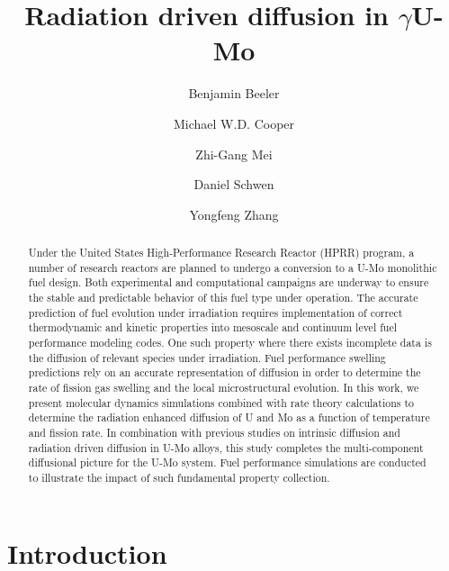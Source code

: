 \documentclass[review]{elsarticle}
\begin{document}
\begin{frontmatter}
\title{Radiation driven diffusion in $\gamma$U-Mo}

\author[ncsu,inl]{Benjamin Beeler}
\author[lanl]{Michael W.D. Cooper}
\author[anl]{Zhi-Gang Mei}
\author[inl]{Daniel Schwen}
\author[wisc,inl]{Yongfeng Zhang}
\address[ncsu]{North Carolina State University, Raleigh, NC 27695}
\address[inl]{Idaho National Laboratory, Idaho Falls, ID 83415}
\address[lanl]{Los Alamos National Laboratory, Los Alamos, NM 87545}
\address[anl]{Argonne National Laboratory, Lemont, IL 60439}
\address[wisc]{University of Wisconsin-Madison, Madison, WI 53715}

\begin{abstract}
Under the United States High-Performance Research Reactor (HPRR) program, a number of research reactors are planned to undergo a conversion to a U-Mo monolithic fuel design. Both experimental and computational campaigns are underway to ensure the stable and predictable behavior of this fuel type under operation. The accurate prediction of fuel evolution under irradiation requires implementation of correct thermodynamic and kinetic properties into mesoscale and continuum level fuel performance modeling codes. One such property where there exists incomplete data is the diffusion of relevant species under irradiation. Fuel performance swelling predictions rely on an accurate representation of diffusion in order to determine the rate of fission gas swelling and the local microstructural evolution. In this work, we present molecular dynamics simulations combined with rate theory calculations to determine the radiation enhanced diffusion of U and Mo as a function of temperature and fission rate. In combination with previous studies on intrinsic diffusion and radiation driven diffusion in U-Mo alloys, this study completes the multi-component diffusional picture for the U-Mo system. Fuel performance simulations are conducted to illustrate the impact of such fundamental property collection. 

\end{abstract}
\end{frontmatter}

\linenumbers
\modulolinenumbers[5]

\section{Introduction}
\end{document}
